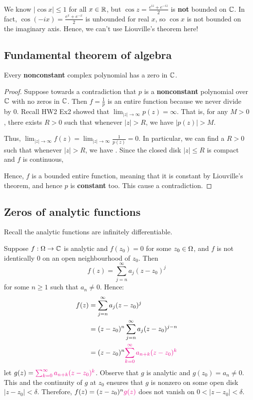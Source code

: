 \documentclass[12pt]{article}
\begin{document}
\noneg We know $|\cos x|\leq 1$ for all $x\in \mathbb{R}$, but $\cos z = \frac{e^{iz}+e^{-iz}}{2}$ is \textbf{not} bounded on $\mathbb{C}$. In fact, $\cos(-ix)=\frac{e^x+e^{-x}}{2}$ is unbounded for real $x$, so $\cos x$ is not bounded on the imaginary axis. Hence, we can't use Liouville's theorem here!

\subsection{Fundamental theorem of algebra}
\begin{theorem}[FToA]
    Every \textbf{nonconstant} complex polynomial has a zero in $\mathbb{C}$.
\end{theorem}
\begin{proof}
    Suppose towards a contradiction that $p$ is a \textbf{nonconstant} polynomial over $\mathbb{C}$ with no zeros in $\mathbb{C}$. Then $f=\frac{1}{p}$ is an entire function because we never divide by 0. Recall HW2 Ex2 showed that $\lim_{|z|\to \infty}p(z)=\infty$. That is, for any $M>0$, there exists $R>0$ such that whenever $|z|>R$, we have $|p(z)|>M$.

    Thus, $\lim_{|z|\to \infty}f(z) =  \lim_{|z|\to \infty}\frac{1}{p(z)}=0$. In particular, we can find a $R>0$ such that whenever $|z|>R$, we have . Since the closed disk $|z|\leq R$ is compact and $f$ is continuous, 

    Hence, $f$ is a bounded entire function, meaning that it is constant by Liouville's theorem, and hence $p$ is \textbf{constant} too. This cause a contradiction.
\end{proof}

\subsection{Zeros of analytic functions}
Recall the analytic functions are infinitely differentiable.

Suppose $f:\Omega\to\mathbb{C}$ is analytic and $f(z_0)=0$ for some $z_0\in \Omega$, and $f$ is not identically 0 on an open neighbourhood of $z_0$. Then \[f(z)=\sum_{j=n}^{\infty}a_j(z-z_0)^j\] for some $n\geq 1$ such that $a_n\neq 0$. Hence: \begin{align*}
    f(z)&=\sum_{j=n}^{\infty}a_j(z-z_0)^j\\
    &= (z-z_0)^n \sum_{j=n}^{\infty}a_j(z-z_0)^{j-n}\\
    &= (z-z_0)^n \textcolor{magenta}{\sum_{k=0}^{\infty}a_{n+k}(z-z_0)^k}
\end{align*}
let $g(z)=\textcolor{magenta}{\sum_{k=0}^{\infty}a_{n+k}(z-z_0)^k}$. Observe that $g$ is analytic and $g(z_0)=a_n\neq 0$. This and the continuity of $g$ at $z_0$ ensures that $g$ is nonzero on some open disk $|z-z_0|<\delta$. Therefore, $f(z)=(z-z_0)^n\textcolor{magenta}{g(z)}$ does not vanish on $0<|z-z_0|<\delta$.
\end{document}
